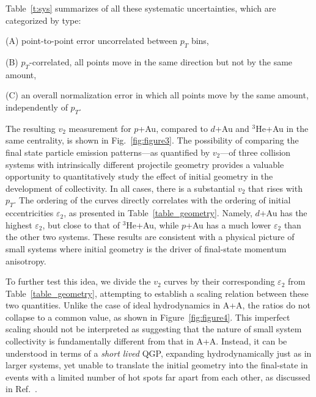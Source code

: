 \documentclass[%
reprint,
showpacs,preprintnumbers,
 amsmath,amssymb,
 aps,
]{revtex4-1}
\newcommand{\pt}{\mbox{$p_T$}\xspace}
\newcommand{\dau}{\mbox{$d$+Au}\xspace}
\newcommand{\pau}{\mbox{$p$+Au}\xspace}
\newcommand{\hau}{\mbox{$^3\text{He}$+Au}\xspace}
\begin{document}
Table~\ref{t:sys} summarizes of all these systematic
uncertainties, which are categorized by type:

(A) point-to-point error uncorrelated between $p_T$ bins,

(B) $p_{T}$-correlated, all points move in the same direction but
not by the same amount,

(C) an overall normalization error in which all points move by the
same amount, independently of $p_T$.

The resulting $v_2$ measurement for \pau, compared to \dau and \hau in the same centrality, is shown in Fig.~\ref{fig:figure3}. The possibility of comparing the final state particle emission patterns---as quantified by $v_2$---of three collision systems with intrinsically different projectile geometry provides a valuable opportunity to quantitatively study the effect of initial geometry in the development of collectivity.  In all cases, there is a substantial $v_2$ that rises with \pt. The ordering of the curves directly correlates with the ordering of initial eccentricities $\varepsilon_2$, as presented in Table~\ref{table_geometry}. Namely, \dau has the highest $\varepsilon_2$, but close to that of \hau, while \pau has a much lower $\varepsilon_2$ than the other two systems. These results are consistent with a physical picture of small systems where initial geometry is the driver of final-state momentum anisotropy.

To further test this idea, we divide the $v_2$ curves by their corresponding $\varepsilon_2$ from Table~\ref{table_geometry}, attempting to establish a scaling relation between these two quantities. Unlike the case of ideal hydrodynamics in A+A, the ratios do not collapse to a common value, as shown in Figure~\ref{fig:figure4}. This imperfect scaling should not be interpreted as suggesting that the nature of small system collectivity is fundamentally different from that in A+A. Instead, it can be understood in terms of a \emph{short lived} QGP, expanding hydrodynamically just as in larger systems, yet unable to translate the initial geometry into the final-state in events with a limited number of hot spots far apart from each other, as discussed in Ref.~\cite{nagle_exploiting_2013}.
\end{document}
